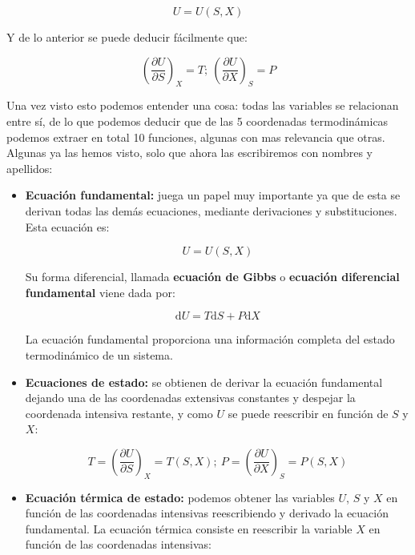 \documentclass[12pt,a4paper]{article}
\newcommand{\D}{\mathrm{d}}
\newcommand{\parentesis}[1]{\left( #1 \right)}
\newcommand{\parciales}[2]{\frac{\partial #1}{\partial #2}}
\begin{document}
\begin{equation}
U = U(S, X)
\end{equation}

Y de lo anterior se puede deducir fácilmente que:

\begin{equation}
\parentesis{\parciales{U}{S}}_X = T; \ \parentesis{\parciales{U}{X}}_S = P
\end{equation}

Una vez visto esto podemos entender una cosa: todas las variables se relacionan entre sí, de lo que podemos deducir que de las 5 coordenadas termodinámicas podemos extraer en total 10 funciones, algunas con mas relevancia que otras. Algunas ya las hemos visto, solo que ahora las escribiremos con nombres y apellidos:

\begin{itemize}
\item \textbf{Ecuación fundamental:} juega un papel muy importante ya que de esta se derivan todas las demás ecuaciones, mediante derivaciones y substituciones. Esta ecuación es:

\begin{equation}
U = U(S,X)
\end{equation}

Su forma diferencial, llamada \textbf{ecuación de Gibbs} o \textbf{ecuación diferencial fundamental} viene dada por:

\begin{equation}
\D U = T \D S + P \D X
\end{equation}

La ecuación fundamental proporciona una información completa del estado termodinámico de un sistema.

\item \textbf{Ecuaciones de estado:} se obtienen de derivar la ecuación fundamental dejando una de las coordenadas extensivas constantes y despejar la coordenada intensiva restante, y como $U$ se puede reescribir en función de $S$ y $X$:

\begin{equation}
T = \parentesis{\parciales{U}{S}}_X = T(S,X) ; \ P = \parentesis{\parciales{U}{X}}_S = P(S,X)
\end{equation}

\item \textbf{Ecuación térmica de estado:}  podemos obtener las variables $U$, $S$ y $X$ en función de las coordenadas intensivas reescribiendo y derivado la ecuación fundamental. La ecuación térmica consiste en reescribir la variable $X$ en función de las coordenadas intensivas:


\end{itemize}
\end{document}
